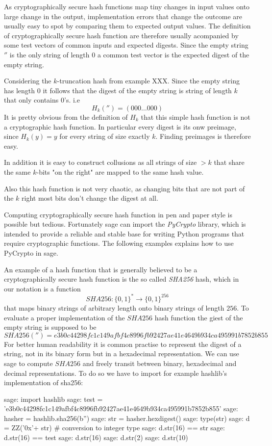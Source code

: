 As cryptographically secure hash functions map tiny changes in input values onto large change in the output, implementation errors that change the outcome are usually easy to spot by comparing them to expected output values. The definition of cryptographically secure hash function are therefore usually acompanied by some test vectors of common inputs and expected digests. Since the empty string $''$ is the only string of length $0$ a common test vector is the expected digest of the empty string.
\begin{example} Considering the $k$-truncation hash from example XXX. Since the empty string has length $0$ it follows that the digest of the empty string is string of length $k$ that only contains $0$'s. i.e 
$$
H_k('')= (000\ldots 000)
$$
It is pretty obvious from the definition of $H_k$ that this simple hash function is not a cryptographic hash function. In particular every digest is its onw preimage, since $H_k(y)=y$ for every string of size exactly $k$. Finding preimages is therefore easy. 

In addition it is easy to construct collusions as all strings of size $>k$ that share the same $k$-bits "on the right" are mapped to the same hash value.

Also this hash function is not very chaotic, as changing bits that are not part of the $k$ right most bits don't change the digest at all.  
\end{example}
Computing cryptographically secure hash function in pen and paper style is possible but tedious. Fortunately sage can import the \textit{PyCrypto} library, which is intended to provide a reliable and stable base for writing Python programs that require cryptographic functions. The following examples explains how to use PyCrypto in sage.
\begin{example}An example of a hash function that is generally believed to be a cryptographically secure hash function is the so called \textit{SHA256} hash, which in our notation is a function
$$
SHA256: \{0,1\}^* \to \{0,1\}^{256}
$$
that maps binary strings of arbitrary length onto binary strings of length $256$. To evaluate a proper implementation of the $SHA256$ hash function the giest of the empty string is supposed to be
$$
SHA256('')= e3b0c44298fc1c149afbf4c8996fb92427ae41e4649b934ca495991b7852b855
$$
For better human readability it is common practise to represent the digest of a string, not in its binary form but in a hexadecimal representation. We can use sage to compute $SHA256$ and freely transit between binary, hexadecimal and decimal representations. To do so we have to import for example hashlib's implementation of sha256:
\begin{sagecommandline}
sage: import hashlib
sage: test = 'e3b0c44298fc1c149afbf4c8996fb92427ae41e4649b934ca495991b7852b855'
sage: hasher = hashlib.sha256(b'')
sage: str = hasher.hexdigest()
sage: type(str)
sage: d = ZZ('0x'+ str) # conversion to integer type
sage: d.str(16) == str
sage: d.str(16) == test
sage: d.str(16)
sage: d.str(2)
sage: d.str(10)
\end{sagecommandline}
\end{example}

